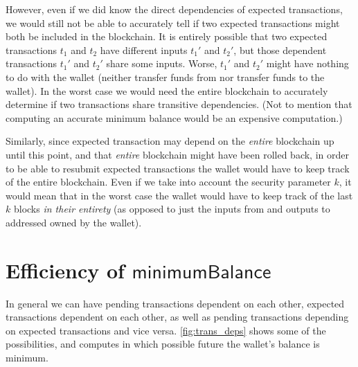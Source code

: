 \documentclass{article}
\theoremstyle{definition}{
  \newtheorem{lemma}{Lemma}[section] %
  \newtheorem{definition}[lemma]{Definition}
}
\theoremstyle{theorem}{
  \newtheorem{invariant}[lemma]{Invariant}
  \newtheorem{proofobligation}[lemma]{Proof Obligation}
}
\numberwithin{equation}{lemma}
\begin{document}
However, even if we did know the direct dependencies of expected transactions,
we would still not be able to accurately tell if two expected transactions might
both be included in the blockchain. It is entirely possible that two expected
transactions $t_1$ and $t_2$ have different inputs $t_1'$ and $t_2'$, but those
dependent transactions $t_1'$ and $t_2'$ share some inputs. Worse, $t_1'$ and
$t_2'$ might have nothing to do with the wallet (neither transfer funds from nor
transfer funds to the wallet). In the worst case we would need the entire
blockchain to  accurately determine if two transactions share transitive
dependencies. (Not to mention that computing an accurate minimum balance
would be an expensive computation.)

Similarly, since expected transaction may depend on the \emph{entire} blockchain
up until this point, and that \emph{entire} blockchain might have been rolled
back, in order to be able to resubmit expected transactions the wallet would
have to keep track of the entire blockchain. Even if we take into account the
security parameter $k$, it would mean that in the worst case the wallet would
have to keep track of the last $k$ blocks \emph{in their entirety} (as opposed
to just the inputs from and outputs to addressed owned by the wallet).

\section{Efficiency of $\mathsf{minimumBalance}$}
\label{sec:computing_minimum_balance}

In general we can have pending transactions dependent on each other, expected
transactions dependent on each other, as well as pending transactions depending
on expected transactions and vice versa. \cref{fig:trans_deps} shows
some of the possibilities, and computes in which possible future the wallet's
balance is minimum.
\end{document}
